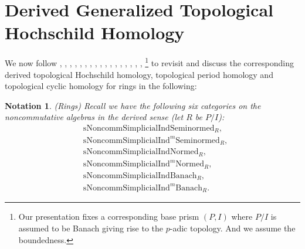 \documentclass[12pt]{book}
\newtheorem{notation}{Notation}
\begin{document}
\newpage
\section{Derived Generalized Topological Hochschild Homology}


We now follow \cite{Grot1}, \cite{Grot2}, \cite{Grot3}, \cite{Grot4}, \cite{BK}, \cite{BBK}, \cite{BBBK}, \cite{BBM}, \cite{KKM}, \cite{T2}, \cite{Sch2}, \cite{BS}, \cite{BL}, \cite{Dr1}, \cite{NS}, \cite{BMS}, \cite{B}, \cite{BHM}\footnote{Our presentation fixes a corresponding base prism $(P,I)$ where $P/I$ is assumed to be Banach giving rise to the $p$-adic topology. And we assume the boundedness. } to revisit and discuss the corresponding derived topological Hochschild homology, topological period homology and topological cyclic homology for rings in the following:

\begin{notation}\mbox{\rm{(Rings)}}
Recall we have the following six categories on the noncommutative algebras in the derived sense (let $R$ be $P/I$):
\begin{align}
&\mathrm{sNoncomm}\mathrm{Simplicial}\mathrm{Ind}\mathrm{Seminormed}_R,\\
&\mathrm{sNoncomm}\mathrm{Simplicial}\mathrm{Ind}^m\mathrm{Seminormed}_R,\\
&\mathrm{sNoncomm}\mathrm{Simplicial}\mathrm{Ind}\mathrm{Normed}_R,\\
&\mathrm{sNoncomm}\mathrm{Simplicial}\mathrm{Ind}^m\mathrm{Normed}_R,\\
&\mathrm{sNoncomm}\mathrm{Simplicial}\mathrm{Ind}\mathrm{Banach}_R,\\
&\mathrm{sNoncomm}\mathrm{Simplicial}\mathrm{Ind}^m\mathrm{Banach}_R.	
\end{align}
	
\end{notation}
\end{document}
